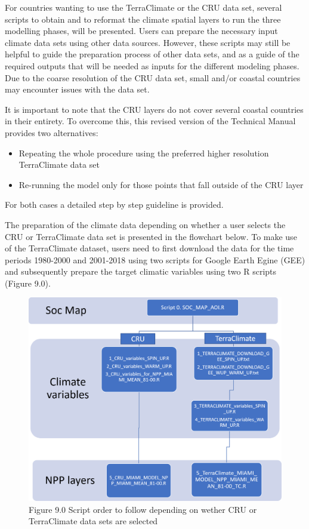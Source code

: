 \documentclass[
  10pt,
  b5paper,
]{book}
\providecommand{\tightlist}{%
  \setlength{\itemsep}{0pt}\setlength{\parskip}{0pt}}
\begin{document}
For countries wanting to use the TerraClimate or the CRU data set, several scripts to obtain and to reformat the climate spatial layers to run the three modelling phases, will be presented. Users can prepare the necessary input climate data sets using other data sources. However, these scripts may still be helpful to guide the preparation process of other data sets, and as a guide of the required outputs that will be needed as inputs for the different modeling phases. Due to the coarse resolution of the CRU data set, small and/or coastal countries may encounter issues with the data set.

It is important to note that the CRU layers do not cover several coastal countries in their entirety. To overcome this, this revised version of the Technical Manual provides two alternatives:

\begin{itemize}
\tightlist
\item
  Repeating the whole procedure using the preferred higher resolution TerraClimate data set
\item
  Re-running the model only for those points that fall outside of the CRU layer
\end{itemize}

For both cases a detailed step by step guideline is provided.

The preparation of the climate data depending on whether a user selects the CRU or TerraClimate data set is presented in the flowchart below. To make use of the TerraClimate dataset, users need to first download the data for the time periods 1980-2000 and 2001-2018 using two scripts for Google Earth Egine (GEE) and subsequently prepare the target climatic variables using two R scripts (Figure 9.0).

\begin{figure}
\centering
\includegraphics{images/Figure_9.0.png}
\caption{Figure 9.0 Script order to follow depending on wether CRU or TerraClimate data sets are selected}
\end{figure}
\end{document}
